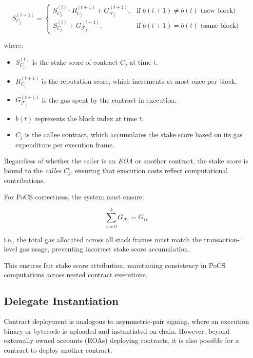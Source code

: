 \documentclass{article}
\begin{document}
\begin{equation}
S_{C_j}^{(t+1)} =
\begin{cases} 
S_{C_j}^{(t)} \cdot R_{C_j}^{(t+1)} + G_{\mathcal{F}_j}^{(t+1)}, & \text{if } b(t+1) \neq b(t) \text{ (new block)} \\
S_{C_j}^{(t)} + G_{\mathcal{F}_j}^{(t+1)}, & \text{if } b(t+1) = b(t) \text{ (same block)}
\end{cases}
\end{equation}

where:
\begin{itemize}
    \item \( S_{C_j}^{(t)} \) is the stake score of contract \( C_j \) at time \( t \).
    \item \( R_{C_j}^{(t+1)} \) is the reputation score, which increments at most once per block.
    \item \( G_{\mathcal{F}_j}^{(t+1)} \) is the gas spent by the contract in execution.
    \item \( b(t) \) represents the block index at time \( t \).
    \item \( C_j \) is the callee contract, which accumulates the stake score based on its gas expenditure per execution frame.
\end{itemize}

Regardless of whether the caller is an \textit{EOA} or another contract, the stake score is bound to the \textit{callee} \( C_j \), ensuring that execution costs reflect computational contributions.

For PoCS correctness, the system must ensure:

\begin{equation}
\sum_{i=0}^{k} G_{\mathcal{F}_i} = G_{\text{tx}}
\end{equation}

i.e., the total gas allocated across all stack frames must match the transaction-level gas usage, preventing incorrect stake score accumulation.

This ensures fair stake score attribution, maintaining consistency in PoCS computations across nested contract executions.

\subsection{Delegate Instantiation}

Contract deployment is analogous to asymmetric-pair signing, where an execution binary or bytecode is uploaded and instantiated on-chain. However, beyond externally owned accounts (EOAs) deploying contracts, it is also possible for a contract to deploy another contract.  
\end{document}
